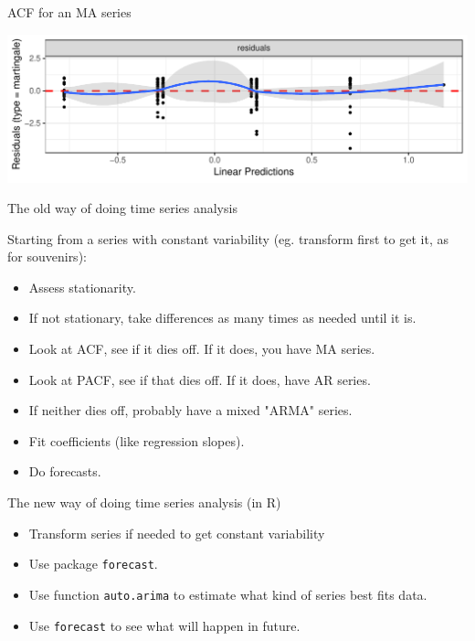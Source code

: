 \begin{frame}[fragile]{ACF for an MA series}
  
\begin{knitrout}
\color{fgcolor}\begin{kframe}
\begin{alltt}
\end{alltt}
\end{kframe}
\includegraphics[width=\maxwidth]{figure/unnamed-chunk-28-1} 

\end{knitrout}
  
\end{frame}


\begin{frame}{The old way of doing time series analysis}
  
Starting from a series with constant variability (eg. transform first to get it, as for souvenirs):

\begin{itemize}
\item Assess stationarity.
\item If not stationary, take differences as many times as needed until it is.
\item Look at ACF, see if it dies off. If it does, you have MA series.
\item Look at PACF, see if that dies off. If it does, have AR series.
\item If neither dies off, probably have a mixed "ARMA" series.
\item Fit coefficients (like regression slopes).
\item Do forecasts.

\end{itemize}
  
\end{frame}

\begin{frame}[fragile]{The new way of doing time series analysis (in R)}
  
  \begin{itemize}
\item Transform series if needed to get constant variability
\item Use package \texttt{forecast}.
\item Use function \texttt{auto.arima} to estimate what kind of series
  best fits data. 
\item Use \texttt{forecast} to see what will happen in future.

  \end{itemize}
  
\end{frame}

